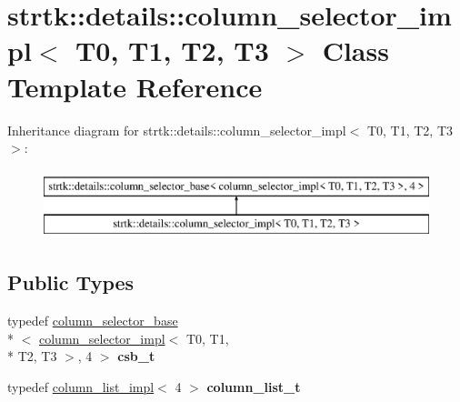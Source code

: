 \hypertarget{classstrtk_1_1details_1_1column__selector__impl_3_01T0_00_01T1_00_01T2_00_01T3_01_4}{\section{strtk\-:\-:details\-:\-:column\-\_\-selector\-\_\-impl$<$ T0, T1, T2, T3 $>$ Class Template Reference}
\label{classstrtk_1_1details_1_1column__selector__impl_3_01T0_00_01T1_00_01T2_00_01T3_01_4}
}
Inheritance diagram for strtk\-:\-:details\-:\-:column\-\_\-selector\-\_\-impl$<$ T0, T1, T2, T3 $>$\-:\begin{figure}[H]
\begin{center}
\leavevmode
\includegraphics[height=2.000000cm]{classstrtk_1_1details_1_1column__selector__impl_3_01T0_00_01T1_00_01T2_00_01T3_01_4}
\end{center}
\end{figure}
\subsection*{Public Types}
\begin{DoxyCompactItemize}
\item 
\hypertarget{classstrtk_1_1details_1_1column__selector__impl_3_01T0_00_01T1_00_01T2_00_01T3_01_4_ade0c63e3226d37aed45943286e1a83dc}{typedef \hyperlink{classstrtk_1_1details_1_1column__selector__base}{column\-\_\-selector\-\_\-base}\\*
$<$ \hyperlink{classstrtk_1_1details_1_1column__selector__impl}{column\-\_\-selector\-\_\-impl}$<$ T0, T1, \\*
T2, T3 $>$, 4 $>$ {\bfseries csb\-\_\-t}}\label{classstrtk_1_1details_1_1column__selector__impl_3_01T0_00_01T1_00_01T2_00_01T3_01_4_ade0c63e3226d37aed45943286e1a83dc}

\item 
\hypertarget{classstrtk_1_1details_1_1column__selector__impl_3_01T0_00_01T1_00_01T2_00_01T3_01_4_abac4a977ecd01e66368b145caa4ef296}{typedef \hyperlink{structstrtk_1_1details_1_1column__list__impl}{column\-\_\-list\-\_\-impl}$<$ 4 $>$ {\bfseries column\-\_\-list\-\_\-t}}\label{classstrtk_1_1details_1_1column__selector__impl_3_01T0_00_01T1_00_01T2_00_01T3_01_4_abac4a977ecd01e66368b145caa4ef296}

\end{DoxyCompactItemize}
